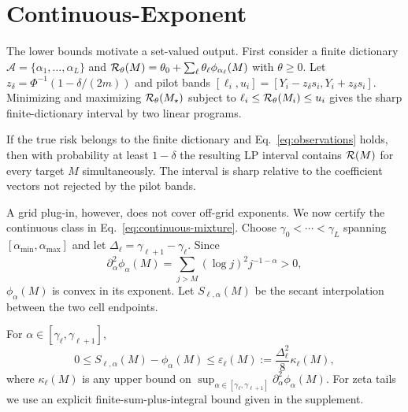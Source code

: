 \section{Continuous-Exponent \ScaleCert}

The lower bounds motivate a set-valued output. First consider a finite dictionary $\mathcal A=\{\alpha_1,\ldots,\alpha_L\}$ and
$\mathcal{R}_\theta(M)=\theta_0+\sum_{\ell}\theta_\ell\phi_{\alpha_\ell}(M)$ with $\theta\ge0$. Let
$z_\delta=\Phi^{-1}(1-\delta/(2m))$ and pilot bands
$[\ell_i,u_i]=[Y_i-z_\delta s_i,Y_i+z_\delta s_i]$.
Minimizing and maximizing $\mathcal{R}_\theta(M_\star)$ subject to
$\ell_i\le\mathcal{R}_\theta(M_i)\le u_i$ gives the sharp finite-dictionary interval by two linear programs.

\begin{theorem}
\label{thm:certificate}
If the true risk belongs to the finite dictionary and Eq.~\eqref{eq:observations} holds, then with probability at least $1-\delta$ the resulting LP interval contains $\mathcal{R}(M)$ for every target $M$ simultaneously. The interval is sharp relative to the coefficient vectors not rejected by the pilot bands.
\end{theorem}

A grid plug-in, however, does not cover off-grid exponents. We now certify the continuous class in Eq.~\eqref{eq:continuous-mixture}. Choose
$\gamma_0<\cdots<\gamma_L$ spanning $[\alpha_{\min},\alpha_{\max}]$ and let $\Delta_\ell=\gamma_{\ell+1}-\gamma_\ell$. Since
\begin{equation}
 \partial_\alpha^2\phi_\alpha(M)
 =\sum_{j>M}(\log j)^2j^{-1-\alpha}>0,
 \label{eq:basis-curvature}
\end{equation}
$\phi_\alpha(M)$ is convex in its exponent. Let $S_{\ell,\alpha}(M)$ be the secant interpolation between the two cell endpoints.

\begin{lemma}
\label{lem:secant}
For $\alpha\in[\gamma_\ell,\gamma_{\ell+1}]$,
\begin{equation}
 0\le S_{\ell,\alpha}(M)-\phi_\alpha(M)
 \le \varepsilon_\ell(M):=
 \frac{\Delta_\ell^2}{8}\kappa_\ell(M),
 \label{eq:secant-bound}
\end{equation}
where $\kappa_\ell(M)$ is any upper bound on
$\sup_{\alpha\in[\gamma_\ell,\gamma_{\ell+1}]}
\partial_\alpha^2\phi_\alpha(M)$. For zeta tails we use an explicit finite-sum-plus-integral bound given in the supplement.
\end{lemma}

